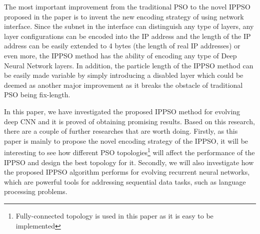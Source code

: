 \documentclass[conference]{IEEEtran}
\begin{document}
The most important improvement from the traditional PSO to the novel IPPSO proposed in the paper is to invent the new encoding strategy of using network interface. Since the subnet in the interface can distinguish any type of layers, any layer configurations can be encoded into the IP address and the length of the IP address can be easily extended to 4 bytes (the length of real IP addresses) or even more, the IPPSO method has the ability of encoding any type of Deep Neural Network layers. In addition, the particle length of the IPPSO method can be easily made variable by simply introducing a disabled layer which could be deemed as another major improvement as it breaks the obstacle of traditional PSO being fix-length. 

In this paper, we have investigated the proposed IPPSO method for evolving deep CNN and it is proved of obtaining promising results. Based on this research, there are a couple of further researches that are worth doing. Firstly, as this paper is mainly to propose the novel encoding strategy of the IPPSO, it will be interesting to see how different PSO topologies\footnote{Fully-connected topology is used in this paper as it is easy to be implemented} will affect the performance of the IPPSO and design the best topology for it. Secondly, we will also investigate how the proposed IPPSO algorithm performs for evolving recurrent neural networks, which are powerful tools for addressing sequential data tasks, such as language processing problems.











\end{document}
